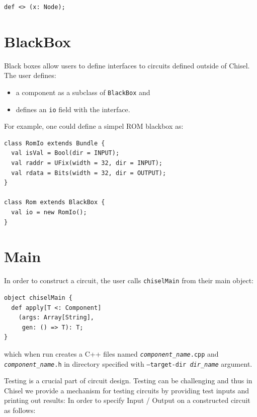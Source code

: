 \documentclass[10pt,twocolumn]{article}
\def\code#1{{\small\tt #1}}
\begin{document}
\begin{lstlisting}
def <> (x: Node);
\end{lstlisting}


\section{BlackBox}

Black boxes allow users to define interfaces to circuits defined
outside of Chisel.  The user defines:

\begin{itemize}
\item a component as a subclass of \code{BlackBox} and
\item defines an \code{io} field with the interface.
\end{itemize}

\noindent
For example, one could define a simpel ROM blackbox as:

\begin{lstlisting}
class RomIo extends Bundle {
  val isVal = Bool(dir = INPUT);
  val raddr = UFix(width = 32, dir = INPUT);
  val rdata = Bits(width = 32, dir = OUTPUT);
}

class Rom extends BlackBox {
  val io = new RomIo();
}
\end{lstlisting}

\section{Main}

In order to construct a circuit, 
the user calls \code{chiselMain} from their main object:

\begin{lstlisting}
object chiselMain {
  def apply[T <: Component]
    (args: Array[String], 
     gen: () => T): T;
}
\end{lstlisting}

\noindent
which when run creates a C++ files named
\code{{\it component\_name}.cpp} and \code{{\it component\_name}.h} in directory specified with
\code{--target-dir {\it dir\_name}} argument.

Testing is a crucial part of circuit design.
Testing can be challenging and thus in Chisel we provide a mechanism for
testing circuits by providing test inputs and printing out results:
In order to specify Input / Output on a constructed circuit as follows:
\end{document}
